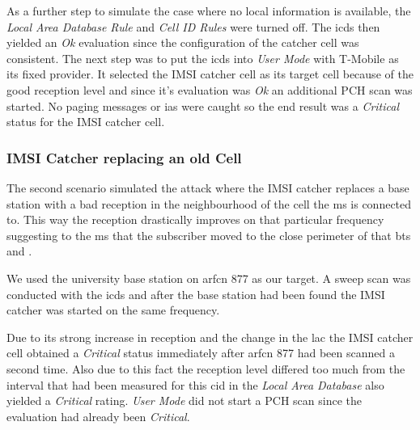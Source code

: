As a further step to simulate the case where no local information is available, the \emph{Local Area Database Rule} and \emph{Cell ID Rules} were turned off.
The \gls{icds} then yielded an \emph{Ok} evaluation since the configuration of the catcher cell was consistent.
The next step was to put the \gls{icds} into \emph{User Mode} with T-Mobile as its fixed provider. 
It selected the IMSI catcher cell as its target cell because of the good reception level and since it's evaluation was \emph{Ok} an additional PCH scan was started.
No paging messages or \glspl{ia} were caught so the end result was a \emph{Critical} status for the IMSI catcher cell.


\subsubsection{IMSI Catcher replacing an old Cell}
The second scenario simulated the attack where the IMSI catcher replaces a base station with a bad reception in the neighbourhood of the cell the \gls{ms} is connected to.
This way the reception drastically improves on that particular frequency suggesting to the \gls{ms} that the subscriber moved to the close perimeter of that \gls{bts} and .

We used the university base station on \gls{arfcn} 877 as our target.
A sweep scan was conducted with the \gls{icds} and after the base station had been found the IMSI catcher was started on the same frequency.

Due to its strong increase in reception and the change in the \gls{lac} the IMSI catcher cell obtained a \emph{Critical} status immediately after \gls{arfcn} 877 had been scanned a second time.
Also due to this fact the reception level differed too much from the interval that had been measured for this \gls{cid}  in the \emph{Local Area Database} also yielded a \emph{Critical} rating.
\emph{User Mode} did not start a PCH scan since the evaluation had already been \emph{Critical}.